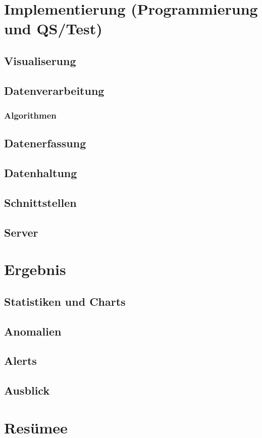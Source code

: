 \documentclass[pdftex,11pt,a4paper]{book}
\begin{document}
\chapter{Implementierung (Programmierung und QS/Test)}
\section{Visualiserung}
\section{Datenverarbeitung}
\subsection{Algorithmen}
\section{Datenerfassung}
\section{Datenhaltung}
\section{Schnittstellen}
\section{Server}


\chapter{Ergebnis}
\section{Statistiken und Charts}
\section{Anomalien}
\section{Alerts}
\section{Ausblick}

\chapter{Resümee}
\end{document}
